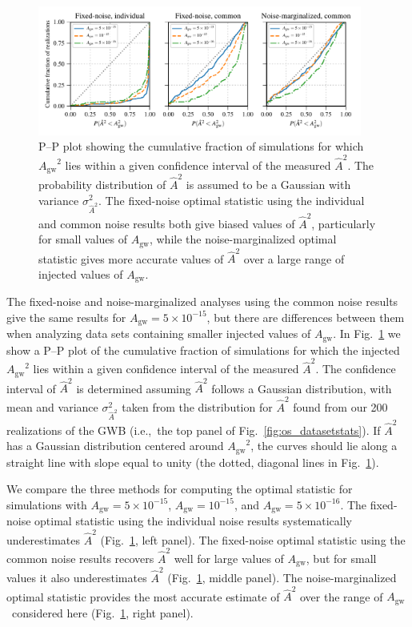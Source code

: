\documentclass[twocolumn,aps,prd,superscriptaddress]{revtex4-1}
\newcommand{\Agw}{\ensuremath{A_\mathrm{gw}}}
\begin{document}
\begin{figure}[tb]
	\includegraphics[width=0.95\textwidth]{plots/pp_plot.pdf}
	\caption{P--P plot showing the cumulative fraction of simulations for which $\Agw^2$ lies within 
			a given confidence interval of the measured $\hat{A}^2$. 
			The probability distribution of $\hat{A}^2$ is assumed to be a Gaussian 
			with variance $\sigma^2_{\hat{A}^2}$. 
			The fixed-noise optimal statistic using the individual and common noise results 
			both give biased values of $\hat{A}^2$, particularly for small values of \Agw, 
			while the noise-marginalized optimal statistic gives more accurate values of $\hat{A}^2$ 
			over a large range of injected values of \Agw.}
	\label{fig:os_compare}
\end{figure}

The fixed-noise and noise-marginalized analyses 
using the common noise results give the same results 
for $\Agw = 5\times10^{-15}$, 
but there are differences between them when analyzing data sets 
containing smaller injected values of $\Agw$. 
In Fig.~\ref{fig:os_compare} we show a P--P plot 
of the cumulative fraction of simulations for which the injected $\Agw^2$ lies within 
a given confidence interval of the measured $\hat{A}^2$. 
The confidence interval of $\hat{A}^2$ is determined 
assuming $\hat{A}^2$ follows a Gaussian distribution, 
with mean and variance $\sigma^2_{\hat{A}^2}$ 
taken from the distribution for $\hat{A}^2$ 
found from our 200 realizations of the GWB (i.e.,~the top panel of Fig.~\ref{fig:os_datasetstats}).
If $\hat{A}^2$ has a Gaussian distribution centered around $\Agw^2$, 
the curves should lie along a straight line with slope equal to unity (the dotted, diagonal lines in Fig.~\ref{fig:os_compare}).

We compare the three methods for computing the optimal statistic for 
simulations with $\Agw=5\times10^{-15}$, $\Agw=10^{-15}$, and $\Agw=5\times10^{-16}$. 
The fixed-noise optimal statistic using the individual noise results systematically underestimates $\hat{A}^2$ 
(Fig.~\ref{fig:os_compare}, left panel). 
The fixed-noise optimal statistic using the common noise results 
recovers $\hat{A}^2$ well for large values of $\Agw$, but for small values it also underestimates $\hat{A}^2$ 
(Fig.~\ref{fig:os_compare}, middle panel). 
The noise-marginalized optimal statistic provides the most accurate estimate of $\hat{A}^2$ 
over the range of \Agw\ considered here (Fig.~\ref{fig:os_compare}, right panel).
\end{document}
